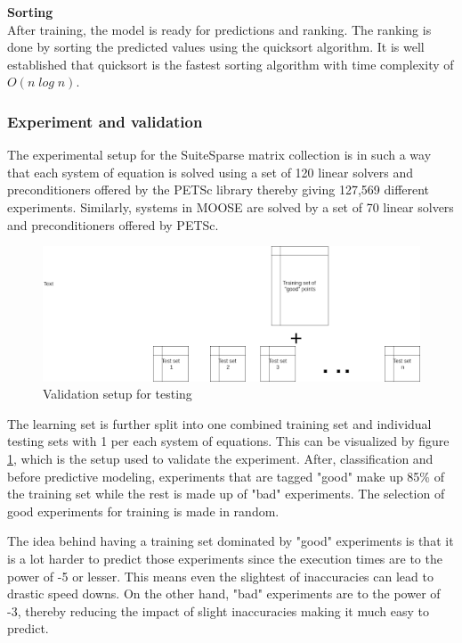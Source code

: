 \textbf{Sorting}\\
After training, the model is ready for predictions and ranking. The ranking is done by sorting the predicted values using the quicksort algorithm. It is well established that quicksort is the fastest sorting algorithm with time complexity of $O(n\;log\;n)$.


\subsubsection{Experiment and validation}
The experimental setup for the SuiteSparse matrix collection is in such a way that each system of equation is solved using a set of 120 linear solvers and preconditioners offered by the PETSc library thereby giving 127,569 different experiments. Similarly, systems in MOOSE are solved by a set of 70 linear solvers and preconditioners offered by PETSc. 


\begin{figure}
    \centering
    \includegraphics[width=1\columnwidth]{figures/rank_split.png}
    \caption{Validation setup for testing}
    \label{Validation setup for testing}
\end{figure}

The learning set is further split into one combined training set and individual testing sets with 1 per each system of equations. This can be visualized by figure \ref{Validation setup for testing}, which is the setup used to validate the experiment. After, classification and before predictive modeling, experiments that are tagged "good" make up 85\% of the training set while the rest is made up of "bad" experiments. The selection of good experiments for training is made in random.

The idea behind having a training set dominated by "good" experiments is that it is a lot harder to predict those experiments since the execution times are to the power of -5 or lesser. This means even the slightest of inaccuracies can lead to drastic speed downs. On the other hand, "bad" experiments are to the power of -3, thereby reducing the impact of slight inaccuracies making it much easy to predict.

